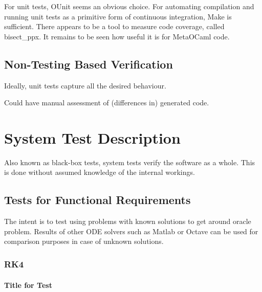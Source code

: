 \documentclass[12pt, titlepage]{article}
\begin{document}
For unit tests, OUnit seems an obvious choice. For automating compilation and 
running unit tests as a primitive form of continuous integration, Make is 
sufficient. There appears to be a tool to measure code coverage, called 
bisect\_ppx. It remains to be seen how useful it is for MetaOCaml code.

		

\subsection{Non-Testing Based Verification}


Ideally, unit tests capture all the desired behaviour.

Could have manual assessment of (differences in) generated code.

\section{System Test Description}

Also known as black-box tests, system tests verify the software as a whole. 
This is done without assumed knowledge of the internal workings.

\subsection{Tests for Functional Requirements}

The intent is to test using problems with known solutions to get around oracle 
problem.
Results of other ODE solvers such as Matlab or Octave can be used for 
comparison purposes in case of unknown solutions.

\subsubsection{RK4}
		
\paragraph{Title for Test}
\end{document}
